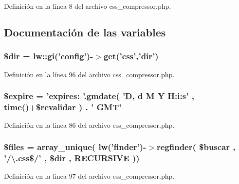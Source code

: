 Definición en la línea 8 del archivo css\-\_\-compressor.\-php.



\subsection{Documentación de las variables}
\hypertarget{css__compressor_8php_a1659f0a629d408e0f849dbe4ee061e62}{
\subsubsection[{\$dir}]{\setlength{\rightskip}{0pt plus 5cm}\$dir = {\bf lw\-::gi}('{\bf config}')-\/$>${\bf get}('css','dir')}}\label{css__compressor_8php_a1659f0a629d408e0f849dbe4ee061e62}


Definición en la línea 96 del archivo css\-\_\-compressor.\-php.

\hypertarget{css__compressor_8php_a5d0f068533ab8205b0e7cb0d19ad03d7}{
\subsubsection[{\$expire}]{\setlength{\rightskip}{0pt plus 5cm}\$expire = 'expires\-: '.gmdate( 'D, d M Y H\-:i\-:s' , time()+\$revalidar ) . ' G\-M\-T'}}\label{css__compressor_8php_a5d0f068533ab8205b0e7cb0d19ad03d7}


Definición en la línea 86 del archivo css\-\_\-compressor.\-php.

\hypertarget{css__compressor_8php_a9590b15215a21e9b42eb546aeef79704}{
\subsubsection[{\$files}]{\setlength{\rightskip}{0pt plus 5cm}\$files = array\-\_\-unique( {\bf lw}('finder')-\/$>$regfinder( \$buscar , '/\textbackslash{}.css\$/' , \$dir , R\-E\-C\-U\-R\-S\-I\-V\-E ))}}\label{css__compressor_8php_a9590b15215a21e9b42eb546aeef79704}


Definición en la línea 97 del archivo css\-\_\-compressor.\-php.

